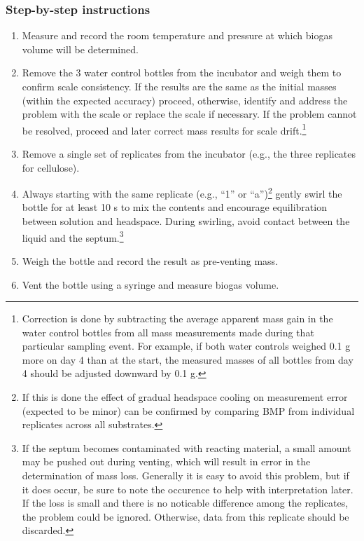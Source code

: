 \documentclass[]{article}
\begin{document}
\subsubsection{Step-by-step instructions}
\begin{enumerate}
    \item Measure and record the room temperature and pressure at which biogas volume will be determined.
    \item Remove the 3 water control bottles from the incubator and weigh them to confirm scale consistency. 
      If the results are the same as the initial masses (within the expected accuracy) proceed, otherwise, identify and address the problem with the scale or replace the scale if necessary.
      If the problem cannot be resolved, proceed and later correct mass results for scale drift.\footnote{
        Correction is done by subtracting the average apparent mass gain in the water control bottles from all mass measurements made during that particular sampling event. 
        For example, if both water controls weighed 0.1 g more on day 4 than at the start, the measured masses of all bottles from day 4 should be adjusted downward by 0.1 g.
      }
    \item Remove a single set of replicates from the incubator (e.g., the three replicates for cellulose).
    \item Always starting with the same replicate (e.g., ``1'' or ``a'')\footnote{
        If this is done the effect of gradual headspace cooling on measurement error (expected to be minor) can be confirmed by comparing BMP from individual replicates across all substrates.
      } gently swirl the bottle for at least 10 s to mix the contents and encourage  equilibration between solution and headspace. 
      During swirling, avoid contact between the liquid and the septum.\footnote{
        If the septum becomes contaminated with reacting material, a small amount may be pushed out during venting, which will result in error in the determination of mass loss.
        Generally it is easy to avoid this problem, but if it does occur, be sure to note the occurence to help with interpretation later.
        If the loss is small and there is no noticable difference among the replicates, the problem could be ignored. 
        Otherwise, data from this replicate should be discarded.
      }
    \item Weigh the bottle and record the result as pre-venting mass.
    \item Vent the bottle using a syringe and measure biogas volume.

\end{enumerate}
\end{document}
